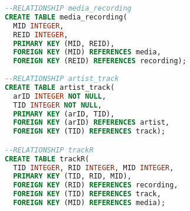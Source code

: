 \documentclass[11pt]{article} %
\begin{document}
\begin{lstlisting}[language=SQL, keywordstyle=\color{blue!70},
commentstyle=\color{red!50!green!50!blue!50},
rulesepcolor=\color{red!20!green!20!blue!20},
frame=shadowbox]
--RELATIONSHIP media_recording
CREATE TABLE media_recording(
  MID INTEGER,
  REID INTEGER,
  PRIMARY KEY (MID, REID),
  FOREIGN KEY (MID) REFERENCES media,
  FOREIGN KEY (REID) REFERENCES recording);
  
--RELATIONSHIP artist_track
CREATE TABLE artist_track(
  arID INTEGER NOT NULL,
  TID INTEGER NOT NULL,
  PRIMARY KEY (arID, TID),
  FOREIGN KEY (arID) REFERENCES artist,
  FOREIGN KEY (TID) REFERENCES track);

--RELATIONSHIP trackR
CREATE TABLE trackR(
  TID INTEGER, RID INTEGER, MID INTEGER,
  PRIMARY KEY (TID, RID, MID),
  FOREIGN KEY (RID) REFERENCES recording,
  FOREIGN KEY (TID) REFERENCES track,
  FOREIGN KEY (MID) REFERENCES media);
\end{lstlisting}
\end{document}
